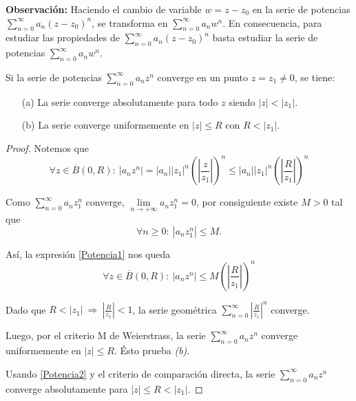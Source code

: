 \textbf{Observación:} Haciendo el cambio de variable $w = z-z_0$ en la serie de potencias \newline $\sum\limits_{n=0}^{\infty} a_n(z-z_0)^n$, se transforma en $\sum\limits_{n=0}^{\infty} a_n w^n$. En consecuencia, para estudiar las propiedades de $\sum\limits_{n=0}^{\infty} a_n(z-z_0)^n$ basta estudiar la serie de potencias $\sum\limits_{n=0}^{\infty} a_n w^n$.

\begin{teorema}\label{ConvergenciaPotencia}
Si la serie de potencias $\sum\limits_{n=0}^{\infty} a_nz^n$ converge en un punto $z = z_1 \neq 0$, se tiene:

\begin{itemize}
\item[(a)] La serie converge absolutamente para todo $z$ siendo $|z| < |z_1|$.

\item[(b)] La serie converge uniformemente en $|z| \leq R$ con $R < |z_1|$.
\end{itemize}
\end{teorema}

\begin{proof}
Notemos que
\begin{equation}
\forall z \in \overline{B}(0,R):~ |a_n z^n| = |a_n| |z_1|^n \left(\left| \frac{z}{z_1} \right| \right)^n \leq |a_n| |z_1|^n \left(\left| \frac{R}{z_1} \right|  \right)^n \label{Potencia1}
\end{equation}

Como $\sum\limits_{n=0}^{\infty} a_n z_1^n$ converge, $\lim\limits_{n \to + \infty} a_nz_1^n = 0$, por consiguiente existe $M > 0$ tal que
$$\forall n \geq 0:~ |a_n z_1^n| \leq M.$$

Así, la expresión \eqref{Potencia1} nos queda
\begin{equation}
\forall z \in \overline{B}(0,R) :~ |a_n z^n| \leq M\left(\left| \frac{R}{z_1} \right|  \right)^n \label{Potencia2}
\end{equation}

Dado que $R < |z_1| ~\Rightarrow~ \left| \frac{R}{z_1} \right| <1$, la serie geométrica $\sum\limits_{n=0}^{\infty} \left| \frac{R}{z_1} \right|^n$ converge.

Luego, por el criterio M de Weierstrass, la serie $\sum\limits_{n=0}^{\infty} a_n z^n$ converge uniformemente en $|z| \leq R$. Ésto prueba \textit{(b)}.

Usando \eqref{Potencia2} y el criterio de comparación directa, la serie $\sum\limits_{n=0}^{\infty} a_n z^n$ converge absolutamente para $|z| \leq R < |z_1|$.

\end{proof}


